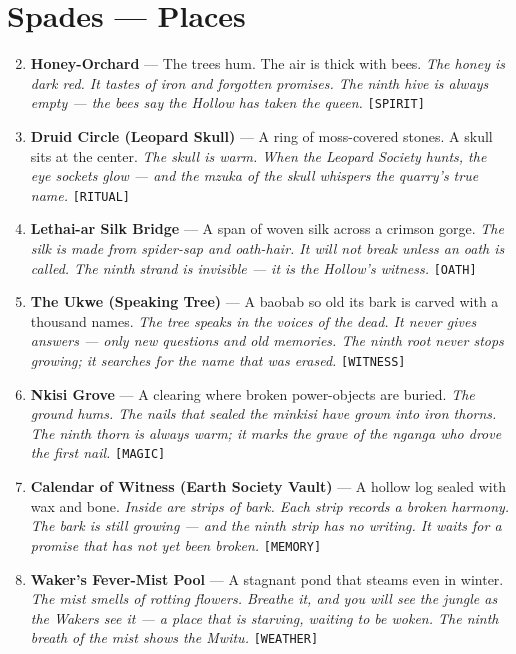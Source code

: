 \section*{Spades --- Places}
\label{sec:sekogo-places}
\begin{enumerate}
\setcounter{enumi}{1}
\item \textbf{Honey-Orchard} --- The trees hum. The air is thick with bees.
  \hfill \textit{The honey is dark red. It tastes of iron and forgotten promises. The ninth hive is always empty --- the bees say the Hollow has taken the queen.} \texttt{[SPIRIT]}
\item \textbf{Druid Circle (Leopard Skull)} --- A ring of moss-covered stones. A skull sits at the center.
  \hfill \textit{The skull is warm. When the Leopard Society hunts, the eye sockets glow --- and the \textit{mzuka} of the skull whispers the quarry's true name.} \texttt{[RITUAL]}
\item \textbf{Lethai-ar Silk Bridge} --- A span of woven silk across a crimson gorge.
  \hfill \textit{The silk is made from spider-sap and oath-hair. It will not break unless an oath is called. The ninth strand is invisible --- it is the Hollow's witness.} \texttt{[OATH]}
\item \textbf{The Ukwe (Speaking Tree)} --- A baobab so old its bark is carved with a thousand names.
  \hfill \textit{The tree speaks in the voices of the dead. It never gives answers --- only new questions and old memories. The ninth root never stops growing; it searches for the name that was erased.} \texttt{[WITNESS]}
\item \textbf{Nkisi Grove} --- A clearing where broken power-objects are buried.
  \hfill \textit{The ground hums. The nails that sealed the \textit{minkisi} have grown into iron thorns. The ninth thorn is always warm; it marks the grave of the nganga who drove the first nail.} \texttt{[MAGIC]}
\item \textbf{Calendar of Witness (Earth Society Vault)} --- A hollow log sealed with wax and bone.
  \hfill \textit{Inside are strips of bark. Each strip records a broken harmony. The bark is still growing --- and the ninth strip has no writing. It waits for a promise that has not yet been broken.} \texttt{[MEMORY]}
\item \textbf{Waker's Fever-Mist Pool} --- A stagnant pond that steams even in winter.
  \hfill \textit{The mist smells of rotting flowers. Breathe it, and you will see the jungle as the Wakers see it --- a place that is starving, waiting to be woken. The ninth breath of the mist shows the \textit{Mwitu}.} \texttt{[WEATHER]}

\end{enumerate}
